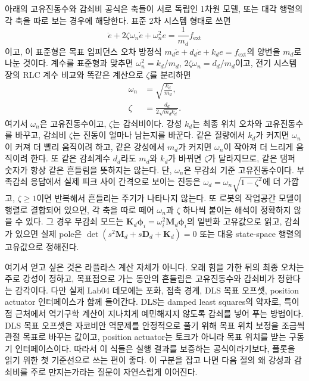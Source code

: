 아래의 고유진동수와 감쇠비 공식은 축들이 서로 독립인 1차원 모델, 또는 대각 행렬의 각 축을 따로 보는 경우에 해당한다.
표준 2차 시스템 형태로 쓰면
\begin{equation}
  \ddot{e}
  +
  2\zeta\omega_n\dot{e}
  +
  \omega_n^2 e
  =
  \frac{1}{m_d}f_{\mathrm{ext}}
\end{equation}
이고,
이 표준형은 목표 임피던스 오차 방정식 $m_d\ddot{e}+d_d\dot{e}+k_de=f_{\mathrm{ext}}$의 양변을 $m_d$로 나눈 것이다.
계수를 표준형과 맞추면 $\omega_n^2=k_d/m_d$, $2\zeta\omega_n=d_d/m_d$이고, 전기 시스템 장의 RLC 계수 비교와 똑같은 계산으로 $\zeta$를 분리하면
%
\begin{align}
  \omega_n &= \sqrt{\frac{k_d}{m_d}}, \\
  \zeta &= \frac{d_d}{2\sqrt{m_d k_d}}.
\end{align}
여기서 $\omega_n$은 고유진동수이고, $\zeta$는 감쇠비이다.
강성 $k_d$는 최종 위치 오차와 고유진동수를 바꾸고, 감쇠비 $\zeta$는 진동이 얼마나 남는지를 바꾼다.
같은 질량에서 $k_d$가 커지면 $\omega_n$이 커져 더 빨리 움직이려 하고, 같은 강성에서 $m_d$가 커지면 $\omega_n$이 작아져 더 느리게 움직이려 한다.
또 같은 감쇠계수 $d_d$라도 $m_d$와 $k_d$가 바뀌면 $\zeta$가 달라지므로, 같은 댐퍼 숫자가 항상 같은 흔들림을 뜻하지는 않는다.
단, $\omega_n$은 무감쇠 기준 고유진동수이다.
부족감쇠 응답에서 실제 피크 사이 간격으로 보이는 진동은 $\omega_d=\omega_n\sqrt{1-\zeta^2}$에 더 가깝고, $\zeta\ge1$이면 반복해서 흔들리는 주기가 나타나지 않는다.
또 로봇의 작업공간 모델이 행렬로 결합되어 있으면, 각 축을 따로 떼어 $\omega_n$과 $\zeta$ 하나씩 붙이는 해석이 정확하지 않을 수 있다.
그 경우 무감쇠 모드는 $\bm{K}_d\bm{\phi}_i=\omega_i^2\bm{M}_d\bm{\phi}_i$의 일반화 고유값으로 읽고, 감쇠가 있으면 실제 pole은 $\det(s^2\bm{M}_d+s\bm{D}_d+\bm{K}_d)=0$ 또는 대응 state-space 행렬의 고유값으로 정해진다.

여기서 얻고 싶은 것은 라플라스 계산 자체가 아니다.
오래 힘을 가한 뒤의 최종 오차는 주로 강성이 정하고, 목표점으로 가는 동안의 흔들림은 고유진동수와 감쇠비가 정한다는 감각이다.
다만 실제 Lab04 데모에는 포화, 접촉 경계, DLS 목표 오프셋, position actuator 인터페이스가 함께 들어간다.
DLS는 damped least squares의 약자로, 특이점 근처에서 역기구학 계산이 지나치게 예민해지지 않도록 감쇠를 넣어 푸는 방법이다.
DLS 목표 오프셋은 자코비안 역문제를 안정적으로 풀기 위해 목표 위치 보정을 조금씩 관절 목표로 바꾸는 값이고, position actuator는 토크가 아니라 목표 위치를 받는 구동기 인터페이스이다.
따라서 이 식들은 실행 결과를 보증하는 공식이라기보다, 플롯을 읽기 위한 첫 기준선으로 쓰는 편이 좋다.
이 구분을 잡고 나면 다음 절의 왜 강성과 감쇠비를 주로 만지는가라는 질문이 자연스럽게 이어진다.

